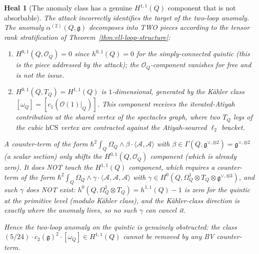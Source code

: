 \documentclass[11pt]{article}
\newtheorem{heal}[theorem]{Heal}
\providecommand{\hCS}{\mathrm{hCS}}
\providecommand{\Om}{\Omega}
\providecommand{\cA}{\mathcal{A}}
\providecommand{\cO}{\mathcal{O}}
\providecommand{\fg}{\mathfrak{g}}
\begin{document}
\begin{heal}[The anomaly class has a genuine $H^{1,1}(Q)$
component that is not absorbable]
\label{heal:quintic-genuine}
The attack incorrectly identifies the target of the two-loop anomaly.
The anomaly $\alpha^{(2)}(Q,\fg)$ decomposes into TWO pieces
according to the tensor rank stratification
of Theorem~\ref{thm:ell-loop-structure}:
\begin{enumerate}[label=(\alph*)]
\item $H^{0,1}(Q, \cO_Q) = 0$ since $h^{0,1}(Q) = 0$ for the
simply-connected quintic (this is the piece addressed by the
attack); the $\cO_Q$-component vanishes for free and is not the
issue.
\item $H^{0,1}(Q, T_Q) = H^{1,1}(Q)$ is $1$-dimensional, generated
by the K\"ahler class $[\omega_Q] = [c_1(\cO(1)|_Q)]$.  This
component receives the iterated-Atiyah contribution at the
\emph{shared vertex} of the spectacles graph, where two $T_Q$
legs of the cubic $\hCS$ vertex are contracted against the
Atiyah-sourced $\ell_2$ bracket.
\end{enumerate}
A counter-term of the form $\hbar^2 \int_Q \Om_Q \wedge \beta \cdot
\langle \cA, \cA\rangle$ with $\beta \in \Gamma(Q, \fg^{\vee, \otimes 2})
= \fg^{\vee, \otimes 2}$ (a scalar section) only shifts the
$H^{0,1}(Q, \cO_Q)$ component (which is already zero).  It does NOT
touch the $H^{1,1}(Q)$ component, which requires a counter-term of
the form $\hbar^2 \int_Q \Om_Q \wedge \gamma \cdot
\langle \cA, \cA, \cA\rangle$ with $\gamma \in H^0(Q, \Om^1_Q
\otimes T_Q \otimes \fg^{\vee,\otimes 3})$, and such $\gamma$ does
NOT exist:  $h^0(Q, \Om^1_Q \otimes T_Q) = h^{1,1}(Q) - 1$ is zero
for the quintic at the primitive level (modulo K\"ahler class), and
the K\"ahler-class direction is exactly where the anomaly lives, so
no such $\gamma$ can cancel it.

Hence the two-loop anomaly on the quintic is genuinely obstructed:
the class $(5/24) \cdot c_2(\fg)^2 \cdot [\omega_Q] \in H^{1,1}(Q)$
cannot be removed by any BV counter-term.
\end{heal}
\end{document}
